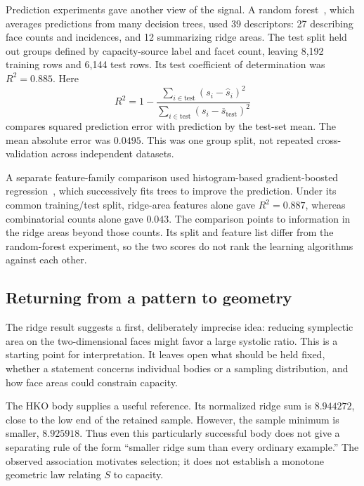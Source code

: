 Prediction experiments gave another view of the signal. A random forest~\cite{dsBreiman2001},
which averages predictions from many decision trees, used 39 descriptors:
27 describing face counts and incidences, and 12 summarizing ridge areas.
The test split held out groups defined by capacity-source label and facet
count, leaving 8,192 training rows and 6,144 test rows. Its test coefficient
of determination was $R^2=0.885$. Here
\[
 R^2=1-\frac{\sum_{i\in\mathrm{test}}(s_i-\widehat s_i)^2}
                   {\sum_{i\in\mathrm{test}}(s_i-\overline s_{\mathrm{test}})^2}
\]
compares squared prediction error with prediction by the test-set mean.
The mean absolute error was $0.0495$. This was one group split, not repeated
cross-validation across independent datasets.

A separate feature-family comparison used histogram-based gradient-boosted
regression~\cite{dsSklearnHGB}, which successively fits trees to improve the prediction. Under
its common training/test split, ridge-area features alone gave $R^2=0.887$,
whereas combinatorial counts alone gave $0.043$. The comparison points to
information in the ridge areas beyond those counts. Its split and feature
list differ from the random-forest experiment, so the two scores do not rank
the learning algorithms against each other.

\subsection{Returning from a pattern to geometry}

The ridge result suggests a first, deliberately imprecise idea: reducing
symplectic area on the two-dimensional faces might favor a large systolic
ratio. This is a starting point for interpretation. It leaves open what
should be held fixed, whether a statement concerns individual bodies or a
sampling distribution, and how face areas could constrain capacity.

The HKO body supplies a useful reference. Its normalized ridge sum is
$8.944272$, close to the low end of the retained sample. However, the sample
minimum is smaller, $8.925918$. Thus even this particularly successful body
does not give a separating rule of the form ``smaller ridge sum than every
ordinary example.'' The observed association motivates selection; it does
not establish a monotone geometric law relating $S$ to capacity.

